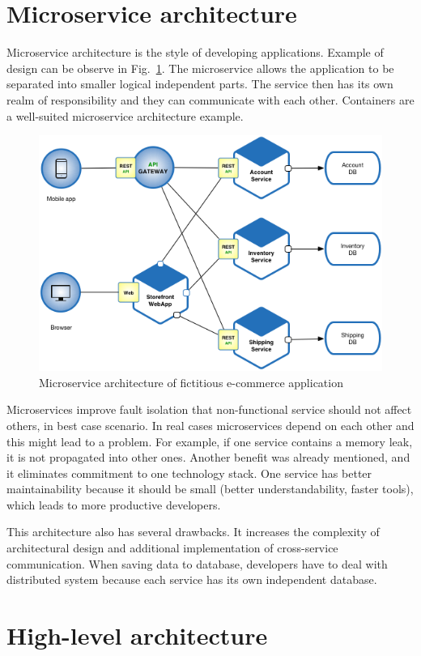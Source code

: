 \section{Microservice architecture}

Microservice architecture is the style of developing applications. Example of design can be observe in Fig.~\ref{fig:microservice_architecture}. The microservice allows the application to be separated into smaller logical independent parts. The service then has its own realm of responsibility and they can communicate with each other. Containers are a well-suited microservice architecture example.~\cite{WhatIsMicroservicesArchitecture}

\begin{figure}[H]
    \centering
    \includegraphics[width=.5\linewidth]{other-fig/microservice_architecture.png}
    \caption{Microservice architecture of fictitious e-commerce application}
    \label{fig:microservice_architecture}
\end{figure}

Microservices improve fault isolation that non-functional service should not affect others, in best case scenario. In real cases microservices depend on each other and this might lead to a problem. For example, if one service contains a memory leak, it is not propagated into other ones. Another benefit was already mentioned, and it eliminates commitment to one technology stack. One service has better maintainability because it should be small (better understandability, faster tools), which leads to more productive developers.~\cite{ MicroserviceArchitecture}

This architecture also has several drawbacks. It increases the complexity of architectural design and additional implementation of cross-service communication. When saving data to database, developers have to deal with distributed system because each service has its own independent database.~\cite{ MicroserviceArchitecture}

\section{High-level architecture}


